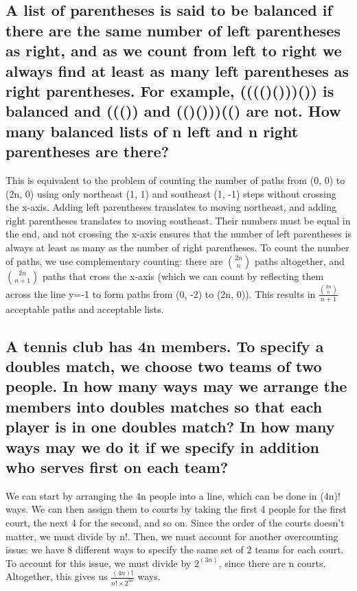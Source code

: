 \subsection{A list of parentheses is said to be balanced if there are the same number of left parentheses as right, and as we count from left to right we always find at least as many left parentheses as right parentheses. For example, (((()()))()) is balanced and ((()) and (()()))(() are not. How many balanced lists of n left and n right parentheses are there?}
This is equivalent to the problem of counting the number of paths from (0, 0) to (2n, 0) using only northeast (1, 1) and southeast (1, -1) steps without crossing the x-axis. Adding left parentheses translates to moving northeast, and adding right parentheses translates to moving southeast. Their numbers must be equal in the end, and not crossing the x-axis ensures that the number of left parentheses is always at least as many as the number of right parentheses. To count the number of paths, we use complementary counting: there are $\binom{2n}n$ paths altogether, and $\binom{2n}{n+1}$ paths that cross the x-axis (which we can count by reflecting them across the line y=-1 to form paths from (0, -2) to (2n, 0)). This results in \(\frac{\binom{2n}{n}}{n+1}\) acceptable paths and acceptable lists. 


\subsection{A tennis club has 4n members. To specify a doubles match, we choose two teams of two people. In how many ways may we arrange the members into doubles matches so that each player is in one doubles match? In how many ways may we do it if we specify in addition who serves first on each team?}
We can start by arranging the 4n people into a line, which can be done in (4n)! ways. We can then assign them to courts by taking the first 4 people for the first court, the next 4 for the second, and so on. Since the order of the courts doesn't matter, we must divide by n!. Then, we must account for another overcounting issue: we have 8 different ways to specify the same set of 2 teams for each court. To account for this issue, we must divide by $2^{(3n)}$, since there are n courts. Altogether, this gives us \(\frac{(4n)!}{n! \times 2^{3n}}\) ways.


